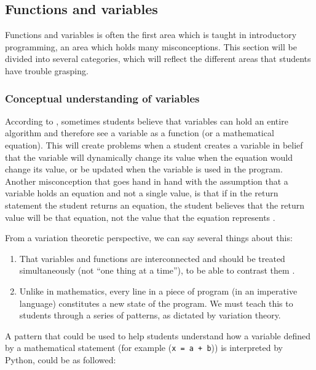 \subsection{Functions and variables}

Functions and variables is often the first area which is taught in 
introductory programming, an area which holds many misconceptions. This 
section will be divided into several categories, which will reflect the 
different areas that students have trouble grasping.  


\subsubsection{Conceptual understanding of variables}
According to 
\textcite{Kohn2017VariableEvaluation,Plass2015Variables,Doukakis2007}, 
sometimes students believe that variables can hold an entire algorithm and 
therefore see a variable as a function (or a mathematical equation). This will 
create problems when a student creates a variable in belief that the variable 
will dynamically change its value when the equation would change its value, or 
be updated
when the variable is used in the program. Another misconception that goes 
hand in hand with the assumption that a 
variable holds an equation and not a single value, is that if in the return 
statement the student returns an equation, the student believes that the 
return 
value will be that equation, not the value that the equation represents 
\parencite{Kohn2017VariableEvaluation}.

From a variation theoretic perspective, we can say several things about this:
\begin{enumerate}
  \item That variables and functions are interconnected and should be 
treated 
    simultaneously (not \enquote{one thing at a time}), to be able to 
contrast 
    them \parencite[\cf][Ch~6, pp~167--168]{NCOL}.
  \item Unlike in mathematics, every line in a piece of program (in an 
    imperative language) constitutes a new state of the program.
    We must teach this to students through a series of patterns, as 
dictated by 
    variation theory.
\end{enumerate}

A pattern that could be used to help students understand how a variable defined 
by a mathematical statement (for example (\texttt{x = a + b})) is 
interpreted by Python, could be as followed:

